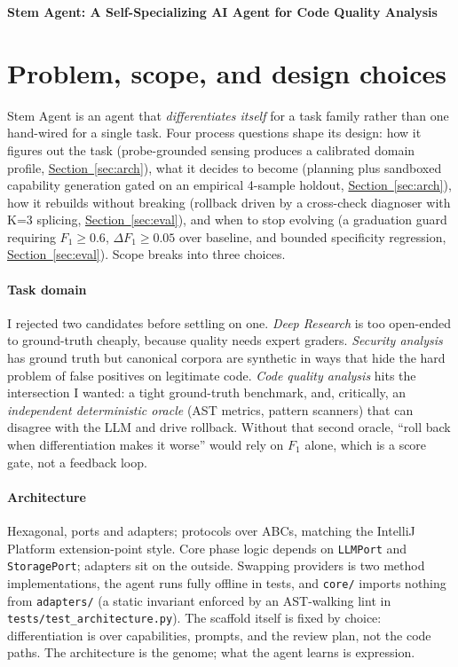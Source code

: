 \documentclass[11pt,a4paper]{article}
\newcommand{\secref}[1]{\hyperref[#1]{Section~\ref*{#1}}}
\begin{document}
\begingroup
\centering
{\Large\bfseries Stem Agent: A Self-Specializing AI Agent for Code Quality Analysis\par}
\endgroup
\vspace{6pt}

\section{Problem, scope, and design choices}\label{sec:problem}

Stem Agent is an agent that \emph{differentiates itself} for a task family rather than one hand-wired for a single task. Four process questions shape its design: how it figures out the task (probe-grounded sensing produces a calibrated domain profile, \secref{sec:arch}), what it decides to become (planning plus sandboxed capability generation gated on an empirical 4-sample holdout, \secref{sec:arch}), how it rebuilds without breaking (rollback driven by a cross-check diagnoser with K=3 splicing, \secref{sec:eval}), and when to stop evolving (a graduation guard requiring $F_1 \geq 0.6$, $\Delta F_1 \geq 0.05$ over baseline, and bounded specificity regression, \secref{sec:eval}). Scope breaks into three choices.

\paragraph{Task domain} I rejected two candidates before settling on one. \emph{Deep Research} is too open-ended to ground-truth cheaply, because quality needs expert graders. \emph{Security analysis} has ground truth but canonical corpora are synthetic in ways that hide the hard problem of false positives on legitimate code. \emph{Code quality analysis} hits the intersection I wanted: a tight ground-truth benchmark, and, critically, an \emph{independent deterministic oracle} (AST metrics, pattern scanners) that can disagree with the LLM and drive rollback. Without that second oracle, ``roll back when differentiation makes it worse'' would rely on $F_1$ alone, which is a score gate, not a feedback loop.

\paragraph{Architecture} Hexagonal, ports and adapters; protocols over ABCs, matching the IntelliJ Platform extension-point style. Core phase logic depends on \texttt{LLMPort} and \texttt{StoragePort}; adapters sit on the outside. Swapping providers is two method implementations, the agent runs fully offline in tests, and \texttt{core/} imports nothing from \texttt{adapters/} (a static invariant enforced by an AST-walking lint in \texttt{tests/test\_architecture.py}). The scaffold itself is fixed by choice: differentiation is over capabilities, prompts, and the review plan, not the code paths. The architecture is the genome; what the agent learns is expression.
\end{document}

